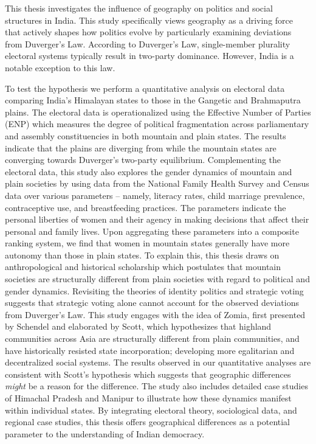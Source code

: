 \begin{sloppypar}
    This thesis investigates the influence of geography on politics and social structures in India. This study specifically views geography as a driving force that actively shapes how  politics evolve by particularly examining deviations from Duverger’s Law. According to Duverger’s Law, single\hyp{}member plurality electoral systems typically result in two\hyp{}party dominance. However, India is  a notable exception to this law. 
\end{sloppypar}
\begin{sloppypar}
    
To test the hypothesis we perform a quantitative analysis on electoral data comparing India’s Himalayan states to those in the Gangetic and Brahmaputra plains. The electoral data is operationalized using the  Effective Number of Parties (ENP) which measures the degree of political fragmentation across parliamentary and assembly constituencies in both mountain and plain states. The results indicate that the plains are diverging from while the mountain states are converging towards Duverger's two-party equilibrium. Complementing the electoral data, this study also explores the gender dynamics of mountain and plain societies by using data from the National Family Health Survey and Census data over various parameters -- namely, literacy rates, child marriage prevalence, contraceptive use, and breastfeeding practices. The parameters indicate the personal liberties of women and their agency in making decisions that affect their personal and family lives. Upon aggregating these parameters into a composite ranking system, we find that women in mountain states generally have more autonomy than those in plain states. To explain this, this thesis draws on anthropological and historical scholarship which postulates that mountain societies are structurally different from plain societies with regard to political and gender dynamics. Revisiting the theories of identity politics and strategic voting suggests that strategic voting alone cannot account for the observed deviations from Duverger's Law. This study engages with the idea of Zomia, first presented by Schendel and elaborated by Scott, which hypothesizes that highland communities across Asia are structurally different from plain communities, and have historically resisted state incorporation; developing more egalitarian and decentralized social systems. The results observed in our quantitative analyses are consistent with Scott's hypothesis which suggests that geographic differences \textit{might} be a reason for the difference. The study also includes detailed case studies of Himachal Pradesh and Manipur to illustrate how these dynamics manifest within individual states. By integrating electoral theory, sociological data, and regional case studies, this thesis offers geographical differences as a potential parameter to the understanding of Indian democracy. 
\end{sloppypar}